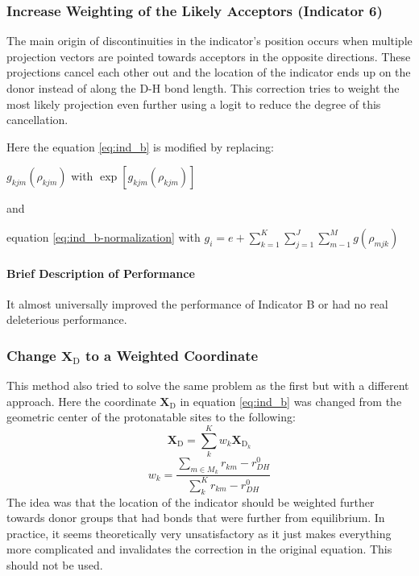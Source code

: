 \documentclass{article}
\newcommand{\mb}[1]{\mathbf{#1}}
\newcommand{\mr}[1]{\mathrm{#1}}
\begin{document}
\subsubsection{Increase Weighting of the Likely Acceptors (Indicator 6)}\label{ss:indicator6}
The main origin of discontinuities in the indicator's position occurs when multiple projection vectors are pointed towards acceptors in the opposite directions.
These projections cancel each other out and the location of the indicator ends up on the donor instead of along the D-H bond length.
This correction tries to weight the most likely projection even further using a logit to reduce the degree of this cancellation.

Here the equation \ref{eq:ind_b} is modified by replacing:

\begin{center}
$g_{kjm}(\rho_{kjm})$ with $\exp \left[ g_{kjm}(\rho_{kjm}) \right]$

and

equation \ref{eq:ind_b-normalization} with $g_i = e + \sum^K_{k=1} \sum^J_{j=1}   \sum^M_{m-1} g(\rho_{mjk})$
\end{center}

\paragraph{Brief Description of Performance}
It almost universally improved the performance of Indicator B or had no real deleterious performance.

\subsubsection{Change $\mb{X}_{\mr{D}}$ to a Weighted Coordinate}\label{ss:indicator9}
This method also tried to solve the same problem as the first but with a different approach.
Here the coordinate $\mb{X}_{\mr{D}}$ in equation \ref{eq:ind_b} was changed from the geometric center of the protonatable sites to the following:
\begin{equation}
\mb{X}_{\mr{D}} = \sum_k^K w_k \mb{X}_{\mr{D}_k}
\end{equation}
\begin{equation}
w_k = \frac{\sum_{m \in M_k} r_{km} - r^0_{DH} }{\sum_k^K r_{km} - r^0_{DH}}
\end{equation}
The idea was that the location of the indicator should be weighted further towards donor groups that had bonds that were further from equilibrium.
In practice, it seems theoretically very unsatisfactory as it just makes everything more complicated and invalidates the correction in the original equation.
This should not be used.
\end{document}
